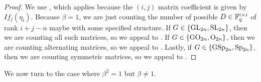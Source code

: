 \begin{proof}
	We use , which applies because the $(i,j)$ matrix coefficient is given by $If_j(\eta_i)$. Because $\beta=1$, we are just counting the number of possible $D\in\mathbb F_q^{i\times i}$ of rank $i+j-n$ maybe with some specified structure. If $G\in\{\mathrm{GL}_{2n},\mathrm{SL}_{2n}\}$, then we are counting all such matrices, so we appeal to \cite[Theorem~7.1.5]{hach-gf}. If $G\in\{\mathrm{GO}_{2n},\mathrm{O}_{2n}\}$, then we are counting alternating matrices, so we appeal to \cite[Theorem~7.5.5]{hach-gf}. Lastly, if $G\in\{\mathrm{GSp}_{2n},\mathrm{Sp}_{2n}\}$, then we are counting symmetric matrices, so we appeal to \cite[Theorem~7.5.2]{hach-gf}.
\end{proof}
We now turn to the case where $\beta^2=1$ but $\beta\ne1$.
